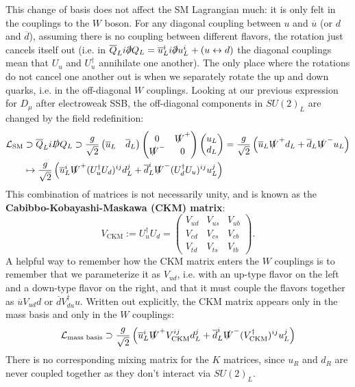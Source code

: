 \documentclass[11pt, oneside]{article}   	%
\theoremstyle{definition}
\numberwithin{equation}{subsection}		%
\begin{document}
This change of basis does not affect the SM Lagrangian much: it is only felt in the couplings to the $W$ boson. For any diagonal coupling 
between $u$ and $\overline u$ (or $d$ and $\overline d$), assuming there is no coupling between different flavors, the rotation just 
cancels itself out (i.e. in $\overline Q_L i\slashed \partial Q_L = \overline u_L^i i\slashed \partial u_L^i + (u\leftrightarrow d)$ the diagonal 
couplings mean that $U_u$ and $U_u^\dagger$ annihilate one another). The only place where the rotations do not cancel one another out 
is when we separately rotate the up and down quarks, i.e. in the off-diagonal $W$ couplings. Looking at our previous expression for 
$D_\mu$ after electroweak SSB, the off-diagonal components in $SU(2)_L$ are changed by the field redefinition:
\begin{align}
	\mathcal L_\mathrm{SM}&\supset\overline Q_L i\slashed D Q_L\supset \frac{g}{\sqrt 2} \begin{pmatrix} \overline u_L & \overline d_L 
	\end{pmatrix} \begin{pmatrix} 0 & \slashed{W}^+ \\ \slashed{W}^- & 0 \end{pmatrix} \begin{pmatrix} u_L \\ d_L \end{pmatrix}
	= \frac{g}{\sqrt 2} \left( \overline u_L \slashed W^+ d_L + \overline d_L \slashed W^- u_L\right) \\
	&\mapsto \frac{g}{\sqrt 2} \left( \overline u_L^i \slashed W^+ (U_u^\dagger U_d)^{ij} d_L^j + \overline d_L^i \slashed W^- (U_d^\dagger 
	U_u)^{ij} u_L^j \right)
\end{align}
This combination of matrices is not necessarily unity, and is known as the \textbf{Cabibbo-Kobayashi-Maskawa (CKM) matrix}:
\begin{equation}
	V_\mathrm{CKM} := U_u^\dagger U_d = \begin{pmatrix} V_{ud} & V_{us} & V_{ub} \\
	V_{cd} & V_{cs} & V_{cb} \\
	V_{td} & V_{ts} & V_{tb}
	 \end{pmatrix}.
\end{equation}
A helpful way to remember how the CKM matrix enters the $W$ couplings is to remember that we parameterize it as $V_{ud}$, i.e. with 
an up-type flavor on the left and a down-type flavor on the right, and that it must couple the flavors together as $\overline u V_{ud} d$ or 
$\overline d V^\dagger_{du} u$. Written out explicitly, the CKM matrix appears only in the mass basis and only in the $W$ couplings:
\begin{equation}
	\mathcal L_\textnormal{mass basis} \supset \frac{g}{\sqrt 2} \left( \overline u_L^i \slashed W^+ V_\mathrm{CKM}^{ij} d_L^j + 
	\overline d_L^i \slashed W^- (V_\mathrm{CKM}^\dagger)^{ij} u_L^j \right)
\end{equation}
There is no corresponding mixing matrix for the $K$ matrices, since $u_R$ and $d_R$ are never coupled together as they don't interact 
via $SU(2)_L$. 
\end{document}
